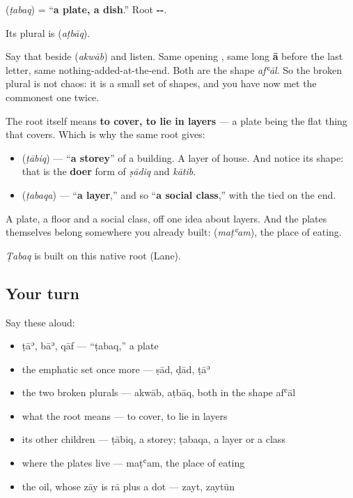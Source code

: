 \begin{cousinweb}
\textbf{} (\emph{ṭabaq}) = \textquotedblleft{}\textbf{a plate, a dish}.\textquotedblright{} Root \textbf{--}.

Its plural is \textbf{} (\emph{aṭbāq}).

Say that beside \textbf{} (\emph{akwāb}) and listen. Same opening \textbf{}, same long \textbf{ā} before the last letter, same nothing-added-at-the-end. Both are the shape \emph{afʿāl}. So the broken plural is not chaos: it is a small set of shapes, and you have now met the commonest one twice.

The root itself means \textbf{to cover, to lie in layers} — a plate being the flat thing that covers. Which is why the same root gives:

\begin{itemize}
\raggedright
  \item \textbf{} (\emph{ṭābiq}) — \textquotedblleft{}\textbf{a storey}\textquotedblright{} of a building. A layer of house. And notice its shape: that is the \textbf{doer} form of \emph{ṣādiq} and \emph{kātib}.
  \item \textbf{} (\emph{ṭabaqa}) — \textquotedblleft{}\textbf{a layer},\textquotedblright{} and so \textquotedblleft{}\textbf{a social class},\textquotedblright{} with the tied \textbf{} on the end.
\end{itemize}

A plate, a floor and a social class, off one idea about layers. And the plates themselves belong somewhere you already built: \textbf{} (\emph{maṭʿam}), the place of eating.

\emph{Ṭabaq} is built on this native root (Lane).
\end{cousinweb}

\subsection*{Your turn}
Say these aloud:

\begin{itemize}
\raggedright
  \item ṭāʾ, bāʾ, qāf — \textquotedblleft{}ṭabaq,\textquotedblright{} a plate
  \item the emphatic set once more — ṣād, ḍād, ṭāʾ
  \item the two broken plurals — akwāb, aṭbāq, both in the shape afʿāl
  \item what the root means — to cover, to lie in layers
  \item its other children — ṭābiq, a storey; ṭabaqa, a layer or a class
  \item where the plates live — maṭʿam, the place of eating
  \item the oil, whose zāy is rā plus a dot — zayt, zaytūn
\end{itemize}

